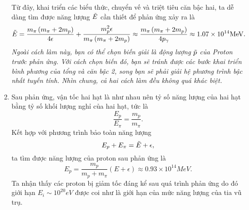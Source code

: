 \begin{enumerate}[label= \alph*)]
\begin{equation}
    \end{equation}
    Từ đây, khai triển các biểu thức, chuyển vế và triệt tiêu căn bậc hai, ta dễ dàng tìm được năng lượng $\Tilde{E}$ cần thiết để phản ứng xảy ra là
    \begin{equation} \label{eq6_GZK_limit}
        \Tilde{E} = \frac{m_{\pi} \left( m_{\pi} + 2 m_p \right)}{4\epsilon}+\frac{m_p^2 \epsilon}{m_{\pi} \left( m_{\pi} + 2 m_p \right)}\approx \frac{m_{\pi} \left( m_{\pi} + 2 m_p \right)}{4p_{\gamma}} \approx 1.07 \times 10^{14}\si{MeV}.
    \end{equation}
    \textit{Ngoài cách làm này, bạn có thể chọn biến giải là động lượng $\Tilde{p}$ của Proton trước phản ứng. Với cách chọn biến đó, bạn sẽ tránh được các bước khai triển bình phương của tổng và căn bậc 2, song bạn sẽ phải giải hệ phương trình bậc nhất tuyến tính. Nhìn chung, cả hai cách làm đều không quá khác biệt.}
    \item Sau phản ứng, vận tốc hai hạt là như nhau nên tỷ số năng lượng của hai hạt bằng tỷ số khối lượng nghỉ của hai hạt, tức là
    \begin{equation} \label{eq7_GZK_limit}
        \dfrac{E_p}{E_{\pi}} = \dfrac{m_p}{m_{\pi}}.
    \end{equation}
    Kết hợp với phương trình bảo toàn năng lượng
    \begin{equation} \label{eq8_GZK_limit}
        E_p + E_{\pi} = \Tilde{E} + \epsilon,
    \end{equation}
    ta tìm được năng lượng của proton sau phản ứng là
    \begin{equation} \label{eq9_GZK_limit}
        E_p = \dfrac{m_p}{m_p+m_{\pi}} (E + \epsilon) \approx 0.93\times 10^{14}\si{MeV}.
    \end{equation}
    Ta nhận thấy các proton bị giảm tốc đáng kể sau quá trình phản ứng do đó giới hạn $E_i\sim 10^{20}\si{ eV} $ được coi như là giới hạn của mức năng lượng của tia vũ trụ.
\end{enumerate}




